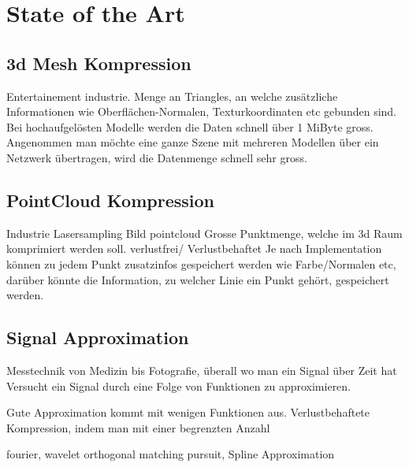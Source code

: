 \section{State of the Art}

\subsection{3d Mesh Kompression}
Entertainement industrie. Menge an Triangles, an welche zusätzliche Informationen wie Oberflächen-Normalen, Texturkoordinaten etc gebunden sind. Bei hochaufgelösten Modelle werden die Daten schnell über 1 MiByte gross. Angenommen man möchte eine ganze Szene mit mehreren Modellen über ein Netzwerk übertragen, wird die Datenmenge schnell sehr gross.

\subsection{PointCloud Kompression}
Industrie Lasersampling
Bild pointcloud
Grosse Punktmenge, welche im 3d Raum komprimiert werden soll.
verlustfrei/ Verlustbehaftet
Je nach Implementation können zu jedem Punkt zusatzinfos gespeichert werden wie Farbe/Normalen etc, darüber könnte die Information, zu welcher Linie ein Punkt gehört, gespeichert werden.

\subsection{Signal Approximation}
Messtechnik von Medizin bis Fotografie, überall wo man ein Signal über Zeit hat
Versucht ein Signal durch eine Folge von Funktionen zu approximieren.

Gute Approximation kommt mit wenigen Funktionen aus.
Verlustbehaftete Kompression, indem man mit einer begrenzten Anzahl

fourier, wavelet orthogonal matching pursuit, Spline Approximation

